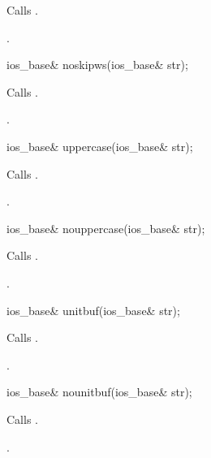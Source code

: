 \begin{itemdescr}
\pnum
\effects
Calls
.

\pnum
\returns
{}.
\end{itemdescr}

%
\begin{itemdecl}
ios_base& noskipws(ios_base& str);
\end{itemdecl}

\begin{itemdescr}
\pnum
\effects
Calls
.

\pnum
\returns
{}.
\end{itemdescr}

%
\begin{itemdecl}
ios_base& uppercase(ios_base& str);
\end{itemdecl}

\begin{itemdescr}
\pnum
\effects
Calls
.

\pnum
\returns
{}.
\end{itemdescr}

%
\begin{itemdecl}
ios_base& nouppercase(ios_base& str);
\end{itemdecl}

\begin{itemdescr}
\pnum
\effects
Calls
.

\pnum
\returns
{}.
\end{itemdescr}

%
\begin{itemdecl}
ios_base& unitbuf(ios_base& str);
\end{itemdecl}

\begin{itemdescr}
\pnum
\effects
Calls
.

\pnum
\returns
{}.
\end{itemdescr}

%
\begin{itemdecl}
ios_base& nounitbuf(ios_base& str);
\end{itemdecl}

\begin{itemdescr}
\pnum
\effects
Calls
.

\pnum
\returns
{}.
\end{itemdescr}


